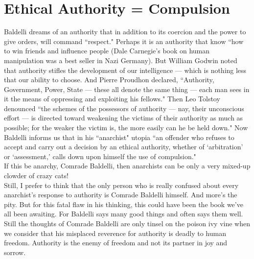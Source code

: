 \section*{Ethical Authority = Compulsion}
Baldelli dreams of an authority that in addition to its coercion and the power to give orders, will command ``respect." Perhaps it is an authority that know ``how to win friends and influence people (Dale Carnegie's book on human manipulation was a best seller in Nazi Germany). But William Godwin noted that authority stifles the development of our intelligence --- which is nothing less that our ability to choose. And Pierre Proudhon declared, ``Authority, Government, Power, State --- these all denote the same thing --- each man sees in it the means of oppressing and exploiting his fellows." Then Leo Tolstoy denounced ``the schemes of the possessors of authority --- nay, their unconscious effort --- is directed toward weakening the victims of their authority as much as possible; for the weaker the victim is, the more easily can he be held down." Now Baldelli informs us that in his ``anarchist" utopia ``an offender who refuses to accept and carry out a decision by an ethical authority, whether of `arbitration' or `assessment,' calls down upon himself the use of compulsion."\\
If this be anarchy, Comrade Baldelli, then anarchists can be only a very mixed-up clowder of crazy cats!\\
Still, I prefer to think that the only person who is really confused about every anarchist's response to authority is Comrade Baldelli himself. And more's the pity. But for this fatal flaw in his thinking, this could have been the book we've all been awaiting. For Baldelli says many good things and often says them well. Still the thoughts of Comrade Baldelli are only tinsel on the poison ivy vine when we consider that his misplaced reverence for authority is deadly to human freedom. Authority is the enemy of freedom and not its partner in joy and sorrow.

